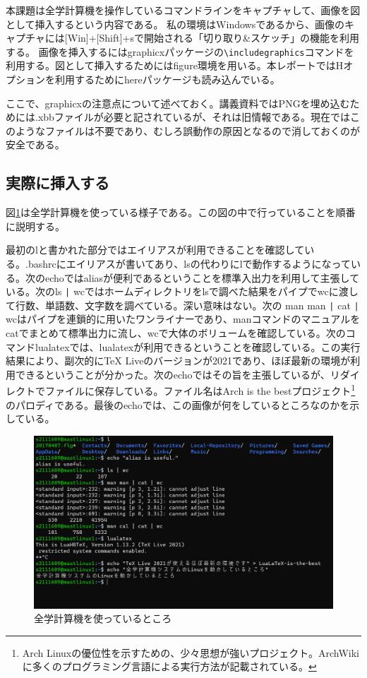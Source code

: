 \documentclass[dvipdfmx,12pt,a4j]{jarticle}
\begin{document}
本課題は全学計算機を操作しているコマンドラインをキャプチャして、画像を図として挿入するという内容である。
私の環境はWindowsであるから、画像のキャプチャには[Win]+[Shift]+sで開始される「切り取り\&スケッチ」の機能を利用する。
画像を挿入するにはgraphicxパッケージの\verb|\includegraphics|コマンドを利用する。図として挿入するためにはfigure環境を用いる。本レポートではHオプションを利用するためにhereパッケージも読み込んでいる。

ここで、graphicxの注意点について述べておく。講義資料ではPNGを埋め込むためには.xbbファイルが必要と記されているが、それは旧情報である。現在ではこのようなファイルは不要であり、むしろ誤動作の原因となるので消しておくのが安全である。\cite[p.126]{bibunsho}

\subsection{実際に挿入する}\label{subsection:実際に挿入する}
図\ref{fig:keisanki}は全学計算機を使っている様子である。この図の中で行っていることを順番に説明する。

最初のlと書かれた部分ではエイリアスが利用できることを確認している。.bashrcにエイリアスが書いてあり、lsの代わりにlで動作するようになっている。次のechoではaliasが便利であるということを標準入出力を利用して主張している。次のls \verb+|+ wcではホームディレクトリをlsで調べた結果をパイプでwcに渡して行数、単語数、文字数を調べている。深い意味はない。次の man man \verb+|+ cat \verb+|+ wcはパイプを連鎖的に用いたワンライナーであり、manコマンドのマニュアルをcatでまとめて標準出力に流し、wcで大体のボリュームを確認している。次のコマンドlualatexでは、lualatexが利用できるということを確認している。この実行結果により、副次的にTeX Liveのバージョンが2021であり、ほぼ最新の環境が利用できるということが分かった。次のechoではその旨を主張しているが、リダイレクトでファイルに保存している。ファイル名はArch is the bestプロジェクト\footnote{Arch Linuxの優位性を示すための、少々思想が強いプロジェクト。ArchWikiに多くのプログラミング言語による実行方法が記載されている。}のパロディである。最後のechoでは、この画像が何をしているところなのかを示している。
\begin{figure}[H]
  \centering
  \includegraphics[width=15cm]{imgs/commandline.png}
  \caption{全学計算機を使っているところ}
  \label{fig:keisanki}
\end{figure}
\end{document}
